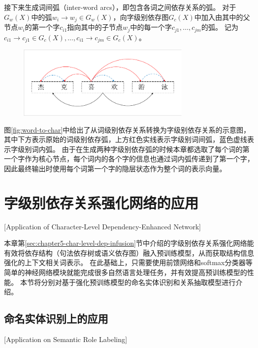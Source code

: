 接下来生成词间弧（inter-word arcs），即包含各词之间依存关系的弧。
对于$G_w(X)$中的弧$w_i \rightarrow w_j \in G_w(X)$，向字级别依存图$G_c(X)$中加入由其中的父节点$w_i$的第一个字$c_{i1}$指向其中的子节点$w_j$中的每一个字$c_{j1}, \dots, c_{jm}$的弧。
记为$c_{i1} \rightarrow c_{j1} \in G_c(X), \dots, c_{i1} \rightarrow c_{jm} \in G_c(X)$。

\begin{figure}[hbtp]
	\centering
	\includegraphics[width=0.75\textwidth]{figures/word-to-char.pdf}
\end{figure}

图\ref{fig:word-to-char}中给出了从词级别依存关系转换为字级别依存关系的示意图，其中下方表示原始的词级别依存弧，上方红色实线表示字级别词间弧，蓝色虚线表示字级别词内弧。
由于在生成两种字级别依存弧的时候本章都选取了每个词的第一个字作为核心节点，每个词内的各个字的信息也通过词内弧传递到了第一个字，因此最终输出时使用每个词第一个字的隐层状态作为整个词的表示向量。


\section{字级别依存关系强化网络的应用}[Application of Character-Level Dependency-Enhanced Network]

本章第\ref{sec:chapter5-char-level-dep-infusion}节中介绍的字级别依存关系强化网络能有效将依存结构（句法依存树或语义依存图）融入预训练模型，从而获取结构信息强化的上下文相关词表示。
在此基础上，只需要使用前馈网络和softmax分类器等简单的神经网络模块就能完成很多自然语言处理任务，并有效提高预训练模型的性能。
本节将分别对基于强化预训练模型的命名实体识别和关系抽取模型进行介绍。

\subsection{命名实体识别上的应用}[Application on Semantic Role Labeling]
\label{sec:chapter5-srl-model}

